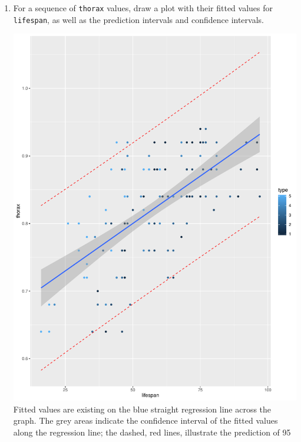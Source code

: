 \documentclass[12pt,letterpaper]{article}
\begin{document}
\begin{enumerate}
	\item	For a sequence of \texttt{thorax} values, draw a plot with their fitted values for \texttt{lifespan}, as well as the prediction intervals and confidence intervals.
	
\includegraphics{plot3-7}
Fitted values are existing on the blue straight regression line across the graph. The grey areas indicate the confidence interval of the fitted values along the regression line; the dashed, red lines, illustrate the prediction of 95%

\end{enumerate}
\end{document}
